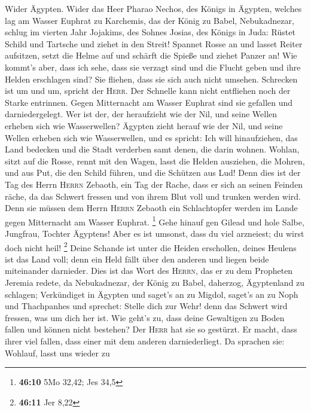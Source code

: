  Wider Ägypten. Wider das Heer Pharao Nechos, des Königs
in Ägypten, welches lag am Wasser Euphrat zu Karchemis, das der König zu
Babel, Nebukadnezar, schlug im vierten Jahr Jojakims, des Sohnes Josias,
des Königs in Juda:  Rüstet Schild und Tartsche und ziehet
in den Streit!  Spannet Rosse an und lasset Reiter
aufsitzen, setzt die Helme auf und schärft die Spieße und ziehet Panzer
an!  Wie kommt's aber, dass ich sehe, dass sie verzagt
sind und die Flucht geben und ihre Helden erschlagen sind? Sie fliehen,
dass sie sich auch nicht umsehen. Schrecken ist um und um, spricht der
\textsc{Herr}.  Der Schnelle kann nicht entfliehen noch
der Starke entrinnen. Gegen Mitternacht am Wasser Euphrat sind sie
gefallen und darniedergelegt.  Wer ist der, der
heraufzieht wie der Nil, und seine Wellen erheben sich wie Wasserwellen?
 Ägypten zieht herauf wie der Nil, und seine Wellen
erheben sich wie Wasserwellen, und es spricht: Ich will hinaufziehen,
das Land bedecken und die Stadt verderben samt denen, die darin wohnen.
 Wohlan, sitzt auf die Rosse, rennt mit den Wagen, lasst
die Helden ausziehen, die Mohren, und aus Put, die den Schild führen,
und die Schützen aus Lud!  Denn dies ist der Tag des
Herrn \textsc{Herrn} Zebaoth, ein Tag der Rache, dass er sich an seinen
Feinden räche, da das Schwert fressen und von ihrem Blut voll und
trunken werden wird. Denn sie müssen dem Herrn \textsc{Herrn} Zebaoth
ein Schlachtopfer werden im Lande gegen Mitternacht am Wasser Euphrat.
\footnote{\textbf{46:10} 5Mo 32,42; Jes 34,5}  Gehe
hinauf gen Gilead und hole Salbe, Jungfrau, Tochter Ägyptens! Aber es
ist umsonst, dass du viel arzneiest; du wirst doch nicht heil!
\footnote{\textbf{46:11} Jer 8,22}  Deine Schande ist
unter die Heiden erschollen, deines Heulens ist das Land voll; denn ein
Held fällt über den anderen und liegen beide miteinander darnieder.
 Dies ist das Wort des \textsc{Herrn}, das er zu dem
Propheten Jeremia redete, da Nebukadnezar, der König zu Babel, daherzog,
Ägyptenland zu schlagen;  Verkündiget in Ägypten und
saget's an zu Migdol, saget's an zu Noph und Thachpanhes und sprechet:
Stelle dich zur Wehr! denn das Schwert wird fressen, was um dich her
ist.  Wie geht's zu, dass deine Gewaltigen zu Boden
fallen und können nicht bestehen? Der \textsc{Herr} hat sie so gestürzt.
 Er macht, dass ihrer viel fallen, dass einer mit dem
anderen darniederliegt. Da sprachen sie: Wohlauf, lasst uns wieder zu
